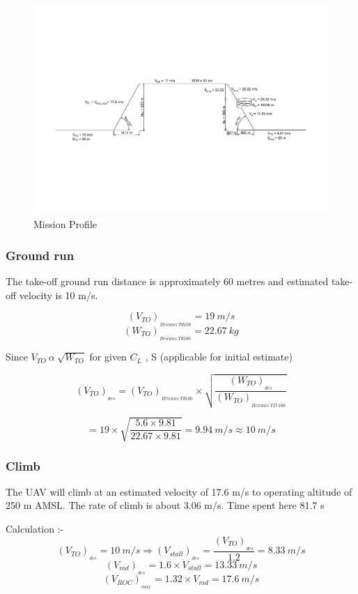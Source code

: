 \documentclass[12 pt]{article}
\begin{document}
\begin{figure}[h]
    \centering
    \includegraphics[width = \linewidth]{Drawing1-Model_final.pdf}
    \caption{Mission Profile}
    \label{Mission Profile}
\end{figure}


\subsubsection{Ground run}
The take-off ground run distance is approximately 60 metres and estimated take-off velocity is 10 m/s. \cite{EgglestonUnknownTitle2015}

$$ (V_{TO})_{_{Bricans \: Td100}} = 19 \: m/s$$
$$ (W_{TO})_{_{Bricans \: Td100}} = 22.67 \: kg$$

Since $ V_{TO} \: \alpha \: \sqrt{W_{TO}} $ for given $C_L$ , S (applicable for initial estimate)

$$ (V_{TO})_{_{des}} = (V_{TO})_{_{Bricans \: Td100}} \times \sqrt{\frac{(W_{TO})_{_{des}}}{(W_{TO})_{_{Bricans \: TD \: 100}}}} $$

$$ = 19 \times \sqrt{\frac{5.6 \times 9.81}{22.67 \times 9.81}} = 9.94 \: m/s \approx 10 \: m/s $$

\subsubsection{Climb \cite{1000_questions} }
The UAV will climb at an estimated velocity of 17.6 m/s to operating altitude of 250 m AMSL. The rate of climb is about 3.06 m/s. Time spent here 81.7 s

Calculation :- 
$$ (V_{TO})_{_{des}} = 10 \: m/s \Rightarrow (V_{stall})_{_{des}} = \frac{(V_{TO})_{_{des}}}{1.2} = 8.33 \: m/s $$
$$ (V_{md})_{_{des}} = 1.6 \times V_{stall} = 13.33 \: m/s $$
$$ (V_{ROC})_{_{max}} = 1.32 \times V_{md} = 17.6 \: m/s $$
\end{document}
